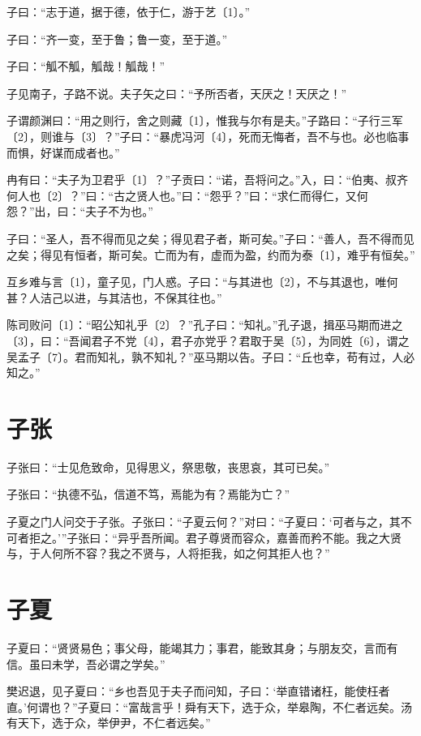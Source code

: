 \documentclass[a5paper]{ctexbook}
\begin{document}
    

    子曰：“志于道，据于德，依于仁，游于艺〔1〕。”

    子曰：“齐一变，至于鲁；鲁一变，至于道。”

    子曰：“觚不觚，觚哉！觚哉！”

    子见南子，子路不说。夫子矢之曰：“予所否者，天厌之！天厌之！”

    子谓颜渊曰：“用之则行，舍之则藏〔1〕，惟我与尔有是夫。”子路曰：“子行三军〔2〕，则谁与〔3〕？”子曰：“暴虎冯河〔4〕，死而无悔者，吾不与也。必也临事而惧，好谋而成者也。”

    冉有曰：“夫子为卫君乎〔1〕？”子贡曰：“诺，吾将问之。”入，曰：“伯夷、叔齐何人也〔2〕？”曰：“古之贤人也。”曰：“怨乎？”曰：“求仁而得仁，又何怨？”出，曰：“夫子不为也。”

    子曰：“圣人，吾不得而见之矣；得见君子者，斯可矣。”子曰：“善人，吾不得而见之矣；得见有恒者，斯可矣。亡而为有，虚而为盈，约而为泰〔1〕，难乎有恒矣。”

    互乡难与言〔1〕，童子见，门人惑。子曰：“与其进也〔2〕，不与其退也，唯何甚？人洁己以进，与其洁也，不保其往也。”

    陈司败问〔1〕：“昭公知礼乎〔2〕？”孔子曰：“知礼。”孔子退，揖巫马期而进之〔3〕，曰：“吾闻君子不党〔4〕，君子亦党乎？君取于吴〔5〕，为同姓〔6〕，谓之吴孟子〔7〕。君而知礼，孰不知礼？”巫马期以告。子曰：“丘也幸，苟有过，人必知之。”

    \chapter{子张}

    子张曰：“士见危致命，见得思义，祭思敬，丧思哀，其可已矣。”
    
    子张曰：“执德不弘，信道不笃，焉能为有？焉能为亡？”
    
    子夏之门人问交于子张。子张曰：“子夏云何？”对曰：“子夏曰：‘可者与之，其不可者拒之。’”子张曰：“异乎吾所闻。君子尊贤而容众，嘉善而矜不能。我之大贤与，于人何所不容？我之不贤与，人将拒我，如之何其拒人也？”

    \chapter{子夏}

    子夏曰：“贤贤易色；事父母，能竭其力；事君，能致其身；与朋友交，言而有信。虽曰未学，吾必谓之学矣。”

    樊迟退，见子夏曰：“乡也吾见于夫子而问知，子曰：‘举直错诸枉，能使枉者直。’何谓也？”子夏曰：“富哉言乎！舜有天下，选于众，举皋陶，不仁者远矣。汤有天下，选于众，举伊尹，不仁者远矣。”
\end{document}
